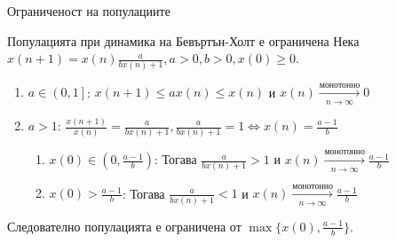 
\begin{frame}[t]{Ограниченост на популациите}

\begin{block}{Популацията при динамика на Бевъртън-Холт е ограничена}
Нека $x(n+1)=x(n)\frac{a}{b x(n) + 1}, a > 0, b > 0,x(0) \geq 0$. \\
\begin{enumerate}[I]

\item $a \in \left(0, 1 \right]$: $x(n+1) \leq a x(n) \leq x(n)$ и $x(n) \xrightarrow[n \to \infty]{\text{монотонно}} 0$


\item $a > 1$: $\frac{x(n+1)}{x(n)}=\frac{a}{b x(n) + 1}, \frac{a}{b x(n) + 1} = 1 \iff x(n) = \frac{a-1}{b}$
\begin{enumerate}

\item $x(0) \in \left(0, \frac{a-1}{b} \right)$: Тогава $\frac{a}{b x(n) + 1} > 1$ и $x(n) \xrightarrow[n \to \infty]{\text{монотонно}} \frac{a-1}{b}$

\item $x(0) > \frac{a-1}{b}$: Тогава $\frac{a}{b x(n) + 1} < 1$ и $x(n) \xrightarrow[n \to \infty]{\text{монотонно}} \frac{a-1}{b}$

\end{enumerate}


\end{enumerate}


Следователно популацията е ограничена от $\max \{x(0), \frac{a-1}{b}\}$.



\end{block}

\end{frame}


